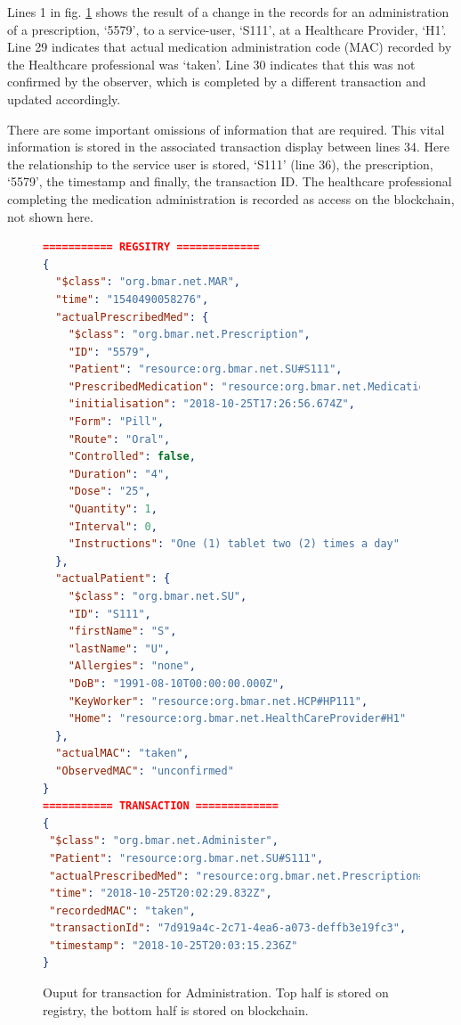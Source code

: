 \documentclass[runningheads]{llncs}
\begin{document}
Lines 1 in fig. \ref{fig:lst:administration} shows the result of a change in the records for an administration of a prescription, `5579', to a service-user, `S111', at a Healthcare Provider, `H1'. Line 29 indicates that actual medication administration code (MAC) recorded by the Healthcare professional was `taken'. Line 30 indicates that this was not confirmed by the observer, which is completed by a different transaction and updated accordingly. 

There are some important omissions of information that are required. This vital information is stored in the associated transaction display between lines 34. Here the relationship to the service user is stored, `S111' (line 36), the prescription, `5579', the timestamp and finally, the transaction ID. The healthcare professional completing the medication administration is recorded as access on the blockchain, not shown here. 


\begin{figure}
	\tiny
	\begin{lstlisting}[language=json,firstnumber=1]
=========== REGSITRY =============
{
  "$class": "org.bmar.net.MAR",
  "time": "1540490058276",
  "actualPrescribedMed": {
    "$class": "org.bmar.net.Prescription",
    "ID": "5579",
    "Patient": "resource:org.bmar.net.SU#S111",
    "PrescribedMedication": "resource:org.bmar.net.Medication#111",
    "initialisation": "2018-10-25T17:26:56.674Z",
    "Form": "Pill",
    "Route": "Oral",
    "Controlled": false,
    "Duration": "4",
    "Dose": "25",
    "Quantity": 1,
    "Interval": 0,
    "Instructions": "One (1) tablet two (2) times a day"
  },
  "actualPatient": {
    "$class": "org.bmar.net.SU",
    "ID": "S111",
    "firstName": "S",
    "lastName": "U",
    "Allergies": "none",
    "DoB": "1991-08-10T00:00:00.000Z",
    "KeyWorker": "resource:org.bmar.net.HCP#HP111",
    "Home": "resource:org.bmar.net.HealthCareProvider#H1"
  },
  "actualMAC": "taken",
  "ObservedMAC": "unconfirmed"
}
=========== TRANSACTION ============= 
{
 "$class": "org.bmar.net.Administer",
 "Patient": "resource:org.bmar.net.SU#S111",
 "actualPrescribedMed": "resource:org.bmar.net.Prescription#5579",
 "time": "2018-10-25T20:02:29.832Z",
 "recordedMAC": "taken",
 "transactionId": "7d919a4c-2c71-4ea6-a073-deffb3e19fc3",
 "timestamp": "2018-10-25T20:03:15.236Z"
}
	\end{lstlisting}
\caption{Ouput for transaction for Administration. Top half is stored on registry, the bottom half is stored on blockchain.}
\label{fig:lst:administration}
\end{figure}
\end{document}
